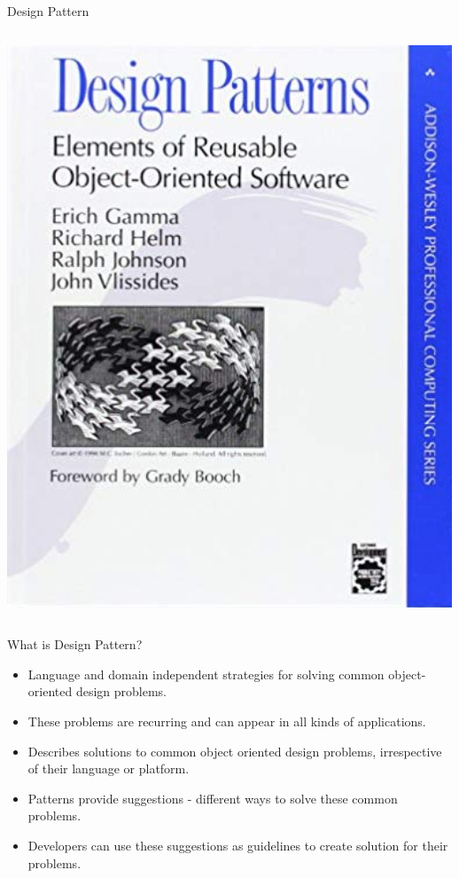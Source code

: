 \documentclass[13pt]{beamer}
\begin{document}
\begin{frame}{Design Pattern}
\begin{columns}[T]
\begin{column}{.5\textwidth}                                              
	\includegraphics[scale=0.3]{gangoffour.png}
\end{column}%
\end{columns}
\end{frame}

\begin{frame}{What is Design Pattern?}
	\begin{itemize}
		\item Language and domain independent strategies for solving common object-oriented design 					  problems.
		\item These problems are recurring and can appear in all kinds of applications.
		\item Describes solutions to common object oriented design problems, irrespective of their 					  language or platform.
		\item Patterns provide suggestions - different ways to solve these common problems.
		\item Developers can use these suggestions as guidelines to create solution for their 						  problems.
	\end{itemize}
\end{frame}
\end{document}
